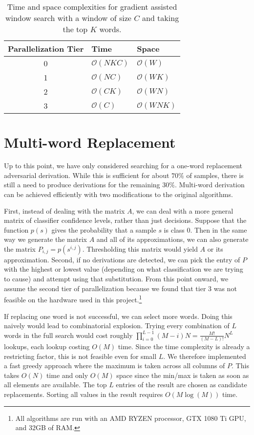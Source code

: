 \begin{table}
\centering
\begin{tabular}{ |c|l|l| } 
 \hline
 Parallelization Tier & Time & Space \\ \hline
 0&$\mathcal{O}(NKC)$ & $\mathcal{O}(W)$ \\
 1&$\mathcal{O}(NC)$ & $\mathcal{O}(WK)$ \\
 2&$\mathcal{O}(CK)$ & $\mathcal{O}(WN)$ \\
 3&$\mathcal{O}(C)$ & $\mathcal{O}(WNK)$ \\ \hline
\end{tabular}
\caption{Time and space complexities for gradient assisted window search with a window of size $C$ and taking the top $K$ words.}
\label{tab:gaws_complexity}
\end{table}
\section{Multi-word Replacement}
Up to this point, we have only considered searching for a one-word replacement adversarial derivation.  While this is sufficient for about $70\%$ of samples, there is still a need to produce derivations for the remaining $30\%$.  Multi-word derivation can be achieved efficiently with two modifications to the original algorithms.

First, instead of dealing with the matrix $A$, we can deal with a more general matrix of classifier confidence levels, rather than just decisions.  Suppose that the function $p(s)$ gives the probability that a sample $s$ is class $0$.  Then in the same way we generate the matrix $A$ and all of its approximations, we can also generate the matrix $P_{i,j} = p(s^{i,j})$.  Thresholding this matrix would yield $A$ or its approximation.  Second, if no derivations are detected, we can pick the entry of $P$ with the highest or lowest value (depending on what classification we are trying to cause) and attempt using that substitution.  From this point onward, we assume the second tier of parallelization because we found that tier 3 was not feasible on the hardware used in this project.\footnote{All algorithms are run with an AMD RYZEN processor, GTX 1080 Ti GPU, and 32GB of RAM.}

If replacing one word is not successful, we can select more words.  Doing this naively would lead to combinatorial explosion.  Trying every combination of $L$ words in the full search would cost roughly $\prod_{i=0}^{L-1} (M-i)N = \frac{M!}{(M-L)!}N^L$ lookups, each lookup costing $O(M)$ time.  Since the time complexity is already a restricting factor, this is not feasible even for small $L$.  We therefore implemented a fast greedy approach where the maximum is taken across all columns of $P$.  This takes $O(N)$ time and only $O(M)$ space since the min/max is taken as soon as all elements are available.  The top $L$ entries of the result are chosen as candidate replacements.  Sorting all values in the result requires $O(M\log(M))$ time.

